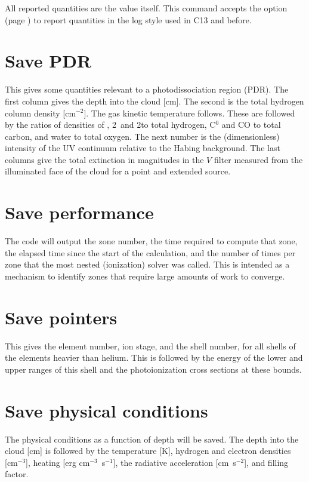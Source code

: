 All reported quantities are the value itself.
This command accepts the  option 
(page \pageref{sec:SaveLogOption}) to report quantities in the
log style used in C13 and before. 

\section{Save PDR}

This gives some quantities relevant to a photodissociation region (PDR).
The first column gives the depth into the cloud [cm].  The second is the
total hydrogen column density [cm$^{-2}$].  The gas kinetic temperature follows.
These are followed by the ratios of densities of \hO, 2\htwo\ and 2\htwo* to total
hydrogen, C$^0$ and CO to total carbon, and water to total oxygen.  The next
number is the (dimensionless) intensity of the UV continuum relative to
the Habing background. The last columns give the total extinction in
magnitudes in the $V$ filter measured from the illuminated face
of the cloud for a point and extended source.

\section{Save performance}

The code will output the zone number, the time required to compute that
zone, the elapsed time since the start of the calculation, and
the number of times per zone that the most nested (ionization) solver was called.
This is intended as a mechanism to identify zones that require large amounts of
work to converge. 

\section{Save pointers}

This gives the element number, ion stage, and the shell number, for all
shells of the elements heavier than helium.
This is followed by the energy
of the lower and upper ranges of this shell and the photoionization cross
sections at these bounds.

\section{Save physical conditions}

The physical conditions as a function of depth will be saved.  The
depth into the cloud [cm] is followed by the temperature [K], hydrogen and
electron densities [cm$^{-3}$], heating [erg cm$^{-3}$~s$^{-1}$], the radiative acceleration
[cm~s$^{-2}$], and filling factor.

